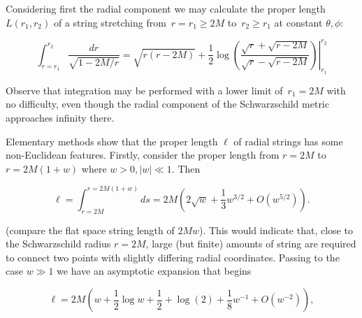 \documentclass[review]{elsarticle}
\begin{document}
Considering first the radial component we may calculate the
proper length $L\left(r_1,r_2\right)$ of a string stretching
from~$r=r_1\geqslant 2M$ to~$r_2\geqslant r_1$ at constant $\theta,\phi$:



\begin{equation}\label{radial_string_length}
  \int_{r=r_1}^{r_2}\frac{dr}{\sqrt{1-2M/r}}=
  \left.
  \sqrt{r(r-2M)} +\frac{1}{2}\log\left(
  \frac{\sqrt{r}+\sqrt{r-2M}}{\sqrt{r}-\sqrt{r-2M}}\right)
  \right|_{r_1}^{r_2}
  \end{equation}

Observe that integration may be performed with a lower limit
of~$r_1=2M$ with no difficulty, even though the radial component of the
Schwarzschild metric approaches infinity there.

Elementary methods show that the proper length $\ell$ of radial
strings has some non-Euclidean features.  Firstly, consider the proper
length from $r=2M$ to $r=2M(1+w)$ where $w>0, \left|w\right|\ll 1$.
Then


 \begin{equation}\label{ell}
   \ell =
   \int_{r=2M}^{r=2M(1+w)}ds
   =2M\left(2\sqrt{w} + \frac{1}{3}w^{3/2} + O(w^{5/2})\right).
 \end{equation}

(compare the flat space string length of $2Mw$).  This would indicate
 that, close to the Schwarzschild radius $r=2M$, large (but finite)
 amounts of string are required to connect two points with slightly
 differing radial coordinates.  Passing to the case $w\gg 1$ we have
 an asymptotic expansion that begins

% 
\begin{equation}\label{asymptotic_ell}
  \ell = 2M\left(w +  \frac{1}{2}\log w + \frac{1}{2} + \log(2)  +  \frac{1}{8}w^{-1} + O(w^{-2})\right),
\end{equation}
\end{document}

